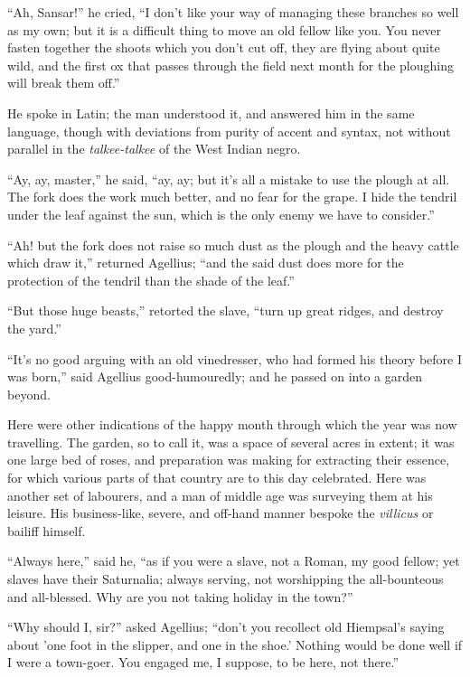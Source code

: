 ``Ah, Sansar!'' he cried, ``I don't like your way of
managing these branches so well as my own; but it is a difficult thing
to move an old fellow like you. You never fasten together the shoots
which you don't cut off, they are flying about quite wild, and the
first ox that passes through the field next month for the
ploughing will break them off.''

He spoke in Latin; the man understood it, and answered him in the
same language, though with deviations from purity of accent and
syntax, not without parallel in the \emph{talkee-talkee} of the West Indian
negro.

``Ay, ay, master,'' he said, ``ay, ay; but it's all a
mistake to use the plough at all. The fork does the work much better,
and no fear for the grape. I hide the tendril under the leaf against
the sun, which is the only enemy we have to consider.''

``Ah! but the fork does not raise so much dust as the plough
and the heavy cattle which draw it,'' returned Agellius; ``and
the said dust does more for the protection of the tendril than the
shade of the leaf.''

``But those huge beasts,'' retorted the slave, ``turn
up great ridges, and destroy the yard.''

``It's no good arguing with an old vinedresser, who had
formed his theory before I was born,'' said Agellius
good-humouredly; and he passed on into a garden beyond.

Here were other indications of the happy month through which the
year was now travelling. The garden, so to call it, was a space of
several acres in extent; it was one large bed of roses, and
preparation was making for extracting their essence, for which various
parts of that country are to this day celebrated. Here was another set
of labourers, and a man of middle age was surveying them at his
leisure. His business-like, severe, and off-hand manner bespoke the \emph{villicus}
or bailiff himself.

``Always here,'' said he, ``as if you were a slave, not
a Roman, my good fellow; yet slaves have their Saturnalia; always
serving, not worshipping the all-bounteous and all-blessed. Why are
you not taking holiday in the town?''

``Why should I, sir?'' asked Agellius; ``don't you
recollect old Hiempsal's saying about 'one foot in the slipper, and
one in the shoe.' Nothing would be done well if I were a town-goer.
You engaged me, I suppose, to be here, not there.''

